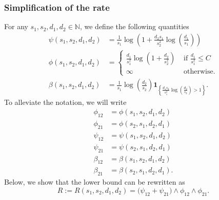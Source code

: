 \documentclass{article}
\theoremstyle{remark}
\begin{document}
\subsubsection{Simplification of the rate}
For any $s_1,s_2, d_1, d_2 \in \mathbb N$, we define the following quantities
\begin{align}
    \psi(s_1,s_2,d_1,d_2) &= \frac{1}{s_1} \log\left(1+ \frac{d_2s_1}{s_2^2} \log\left(\frac{d_1}{s_1}\right)\right) \label{eq_def_psi}\\[10pt]
    \phi(s_1,s_2, d_1,d_2) &= \begin{cases}
        \frac{d_1}{s_1^2} \log\left(1+\frac{d_2}{s_2^2}\right)&  \text{ if } \frac{d_1}{s_1^2} \leq C\\
         \infty & \text{ otherwise.}
    \end{cases}\label{eq_def_phi}\\[10pt]
    \beta(s_1,s_2,d_1,d_2) &= \frac{1}{s_1} \log\left(\frac{d_2}{s_2}\right) \mathbf{1}_{\left\{\frac{d_1s_2}{s_1^2} \log\left(\frac{d_2}{s_2}\right)>1\right\}}.\label{eq_def_nu}
\end{align}
To alleviate the notation, we will write
\begin{align*}
    \phi_{12} &= \phi(s_1,s_2, d_1,d_2)\\
    \phi_{21} &= \phi(s_2,s_1, d_2,d_1)\\
    \psi_{12} &= \psi(s_1,s_2, d_1,d_2)\\
    \psi_{21} &= \psi(s_2,s_1, d_2,d_1)\\
    \beta_{12} &= \beta(s_1,s_2, d_1,d_2)\\
    \beta_{21} &= \beta(s_2,s_1, d_2,d_1).
\end{align*}
Below, we show that the lower bound can be rewritten as
\[R := R(s_1, s_2, d_1, d_2) = \Big(\psi_{12} + \psi_{21}\Big) \land \phi_{12}  \land \phi_{21}.\] 
\end{document}
